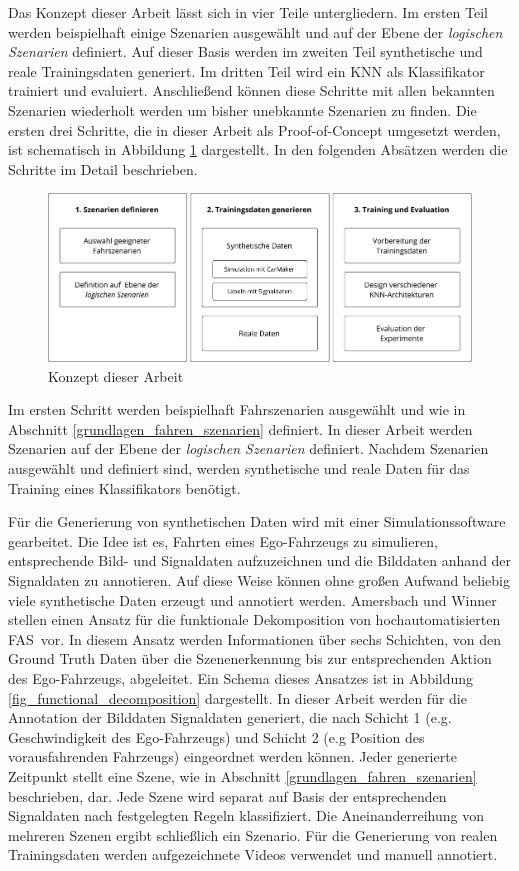 Das Konzept dieser Arbeit lässt sich in vier Teile untergliedern. Im ersten Teil werden beispielhaft einige Szenarien ausgewählt und auf der Ebene der \textit{logischen Szenarien} definiert. Auf dieser Basis werden im zweiten Teil synthetische und reale Trainingsdaten generiert. Im dritten Teil wird ein \ac{KNN} als Klassifikator trainiert und evaluiert. Anschließend können diese Schritte mit allen bekannten Szenarien wiederholt werden um bisher unebkannte Szenarien zu finden. Die ersten drei Schritte, die in dieser Arbeit als Proof-of-Concept umgesetzt werden, ist schematisch in Abbildung \ref{fig_konzept_struktur} dargestellt. In den folgenden Absätzen werden die Schritte im Detail beschrieben.

\begin{figure}[h]
\centering
\includegraphics[scale=0.6]{images/konzept_struktur.pdf}
\caption{Konzept dieser Arbeit}
\label{fig_konzept_struktur}
\end{figure}

Im ersten Schritt werden beispielhaft Fahrszenarien ausgewählt und wie in Abschnitt \ref{grundlagen_fahren_szenarien} definiert. In dieser Arbeit werden Szenarien auf der Ebene der \textit{logischen Szenarien} definiert. Nachdem Szenarien ausgewählt und definiert sind, werden synthetische und reale Daten für das Training eines Klassifikators benötigt.

Für die Generierung von synthetischen Daten wird mit einer Simulationssoftware gearbeitet. Die Idee ist es, Fahrten eines Ego-Fahrzeugs zu simulieren, entsprechende Bild- und Signaldaten aufzuzeichnen und die Bilddaten anhand der Signaldaten zu annotieren. Auf diese Weise können ohne großen Aufwand beliebig viele synthetische Daten erzeugt und annotiert werden. Amersbach und Winner \cite{amersbach2017functional} stellen einen Ansatz für die funktionale Dekomposition von hochautomatisierten \ac{FAS} vor. In diesem Ansatz werden Informationen über sechs Schichten, von den Ground Truth Daten über die Szenenerkennung bis zur entsprechenden Aktion des Ego-Fahrzeugs, abgeleitet. Ein Schema dieses Ansatzes ist in Abbildung \ref{fig_functional_decomposition} dargestellt. In dieser Arbeit werden für die Annotation der Bilddaten Signaldaten generiert, die nach Schicht 1 (e.g. Geschwindigkeit des Ego-Fahrzeugs) und Schicht 2 (e.g Position des vorausfahrenden Fahrzeugs) eingeordnet werden können. Jeder generierte Zeitpunkt stellt eine Szene, wie in Abschnitt \ref{grundlagen_fahren_szenarien} beschrieben, dar. Jede Szene wird separat auf Basis der entsprechenden Signaldaten nach festgelegten Regeln klassifiziert. Die Aneinanderreihung von mehreren Szenen ergibt schließlich ein Szenario. Für die Generierung von realen Trainingsdaten werden aufgezeichnete Videos verwendet und manuell annotiert.

